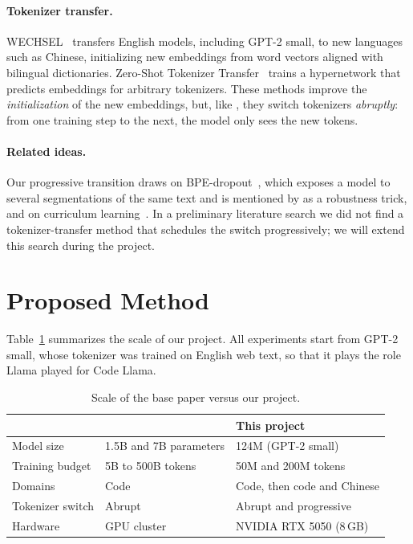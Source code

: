 \documentclass[11pt,a4paper]{article}
\begin{document}
\paragraph{Tokenizer transfer.} WECHSEL~\citep{minixhofer2022wechsel} transfers English models, including GPT-2 small, to new languages such as Chinese, initializing new embeddings from word vectors aligned with bilingual dictionaries. Zero-Shot Tokenizer Transfer~\citep{minixhofer2024zett} trains a hypernetwork that predicts embeddings for arbitrary tokenizers. These methods improve the \emph{initialization} of the new embeddings, but, like \citet{dagan2024tokenizer}, they switch tokenizers \emph{abruptly}: from one training step to the next, the model only sees the new tokens.

\paragraph{Related ideas.} Our progressive transition draws on BPE-dropout~\citep{provilkov2020bpedropout}, which exposes a model to several segmentations of the same text and is mentioned by \citet{dagan2024tokenizer} as a robustness trick, and on curriculum learning~\citep{bengio2009curriculum}. In a preliminary literature search we did not find a tokenizer-transfer method that schedules the switch progressively; we will extend this search during the project.

\section{Proposed Method}
\label{sec:method}

Table~\ref{tab:scale} summarizes the scale of our project. All experiments start from GPT-2 small, whose tokenizer was trained on English web text, so that it plays the role Llama played for Code Llama.

\begin{table}[h]
\centering
\caption{Scale of the base paper versus our project.}
\label{tab:scale}
\begin{tabular}{lll}
\toprule
 & \citet{dagan2024tokenizer} & This project \\
\midrule
Model size & 1.5B and 7B parameters & 124M (GPT-2 small) \\
Training budget & 5B to 500B tokens & 50M and 200M tokens \\
Domains & Code & Code, then code and Chinese \\
Tokenizer switch & Abrupt & Abrupt and progressive \\
Hardware & GPU cluster & NVIDIA RTX 5050 (8\,GB) \\
\bottomrule
\end{tabular}
\end{table}
\end{document}
